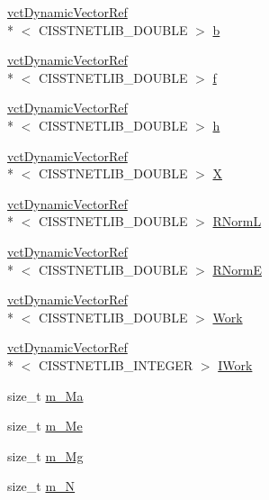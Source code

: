 \begin{DoxyCompactItemize}
\item 
\hyperlink{classvct_dynamic_vector_ref}{vct\-Dynamic\-Vector\-Ref}\\*
$<$ C\-I\-S\-S\-T\-N\-E\-T\-L\-I\-B\-\_\-\-D\-O\-U\-B\-L\-E $>$ \hyperlink{classnmr_l_sq_lin_solution_dynamic_a38efbfac59be113b58fd8a23cf543e5f}{b}
\item 
\hyperlink{classvct_dynamic_vector_ref}{vct\-Dynamic\-Vector\-Ref}\\*
$<$ C\-I\-S\-S\-T\-N\-E\-T\-L\-I\-B\-\_\-\-D\-O\-U\-B\-L\-E $>$ \hyperlink{classnmr_l_sq_lin_solution_dynamic_a218e6ab273eb85a0bc7d44560c5d6b4f}{f}
\item 
\hyperlink{classvct_dynamic_vector_ref}{vct\-Dynamic\-Vector\-Ref}\\*
$<$ C\-I\-S\-S\-T\-N\-E\-T\-L\-I\-B\-\_\-\-D\-O\-U\-B\-L\-E $>$ \hyperlink{classnmr_l_sq_lin_solution_dynamic_a97ed162438c8ef72a0348e323c4b75d8}{h}
\item 
\hyperlink{classvct_dynamic_vector_ref}{vct\-Dynamic\-Vector\-Ref}\\*
$<$ C\-I\-S\-S\-T\-N\-E\-T\-L\-I\-B\-\_\-\-D\-O\-U\-B\-L\-E $>$ \hyperlink{classnmr_l_sq_lin_solution_dynamic_a170954053506de199dd1636a50107538}{X}
\item 
\hyperlink{classvct_dynamic_vector_ref}{vct\-Dynamic\-Vector\-Ref}\\*
$<$ C\-I\-S\-S\-T\-N\-E\-T\-L\-I\-B\-\_\-\-D\-O\-U\-B\-L\-E $>$ \hyperlink{classnmr_l_sq_lin_solution_dynamic_a22c21675797a08a3c2eebcc434349b52}{R\-Norm\-L}
\item 
\hyperlink{classvct_dynamic_vector_ref}{vct\-Dynamic\-Vector\-Ref}\\*
$<$ C\-I\-S\-S\-T\-N\-E\-T\-L\-I\-B\-\_\-\-D\-O\-U\-B\-L\-E $>$ \hyperlink{classnmr_l_sq_lin_solution_dynamic_a926199076fae2e60b277da1c65d2cbb6}{R\-Norm\-E}
\item 
\hyperlink{classvct_dynamic_vector_ref}{vct\-Dynamic\-Vector\-Ref}\\*
$<$ C\-I\-S\-S\-T\-N\-E\-T\-L\-I\-B\-\_\-\-D\-O\-U\-B\-L\-E $>$ \hyperlink{classnmr_l_sq_lin_solution_dynamic_ae9c178092a5766140b996fa2f0287a06}{Work}
\item 
\hyperlink{classvct_dynamic_vector_ref}{vct\-Dynamic\-Vector\-Ref}\\*
$<$ C\-I\-S\-S\-T\-N\-E\-T\-L\-I\-B\-\_\-\-I\-N\-T\-E\-G\-E\-R $>$ \hyperlink{classnmr_l_sq_lin_solution_dynamic_a19d6282ccc51cf567872e789d8c29596}{I\-Work}
\item 
size\-\_\-t \hyperlink{classnmr_l_sq_lin_solution_dynamic_af4d36bff68292f11c394e3b25f72ec5a}{m\-\_\-\-Ma}
\item 
size\-\_\-t \hyperlink{classnmr_l_sq_lin_solution_dynamic_ab51f9f0e7619b486df679dc628d834be}{m\-\_\-\-Me}
\item 
size\-\_\-t \hyperlink{classnmr_l_sq_lin_solution_dynamic_a99844dfbfa96ef5d06dae1b1f7668d9e}{m\-\_\-\-Mg}
\item 
size\-\_\-t \hyperlink{classnmr_l_sq_lin_solution_dynamic_a3e9965e37ad30a163ef241d96d7b3cfc}{m\-\_\-\-N}
\end{DoxyCompactItemize}
